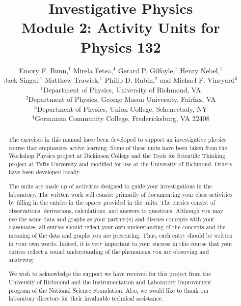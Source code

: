 \title{Investigative Physics\\
Module 2: Activity Units for Physics 132}

\author{Emory F. Bunn,$^1$ Mirela Fetea,$^4$ Gerard P. Gilfoyle,$^1$ Henry Nebel,$^1$ \\Jack Singal,$^1$ Matthew Trawick,$^1$ Philip D. Rubin,$^2$ and Michael F. Vineyard$^3$\\[4pt]
$^1$Department of Physics, University of Richmond, VA \\[4pt]
$^2$Department of Physics, George Mason University, Fairfax, VA \\[4pt]
$^3$Department of Physics, Union College, Schenectady, NY \\[4pt]
$^4$Germanna Community College, Fredericksburg, VA 22408}


\maketitle
\begin{abstract}
The exercises in this manual have been developed to support an investigative
physics course that emphasizes active learning. Some of these units
have been taken from the Workshop Physics project at Dickinson College
and the Tools for Scientific Thinking project at Tufts University
and modified for use at the University of Richmond. Others have been
developed locally. 

The units are made up of activities designed to guide your investigations
in the laboratory. The written work will consist primarily of documenting
your class activities by filling in the entries in the spaces provided
in the units. The entries consist of observations, derivations, calculations,
and answers to questions. Although you may use the same data and graphs
as your partner(s) and discuss concepts with your classmates, all
entries should reflect your own understanding of the concepts and
the meaning of the data and graphs you are presenting. Thus, each
entry should be written in your own words. Indeed, it is very important
to your success in this course that your entries reflect a sound understanding
of the phenomena you are observing and analyzing. 

We wish to acknowledge the support we have received for this project
from the University of Richmond and the Instrumentation and Laboratory
Improvement program of the National Science Foundation. Also, we would
like to thank our laboratory directors for their invaluable technical
assistance.
\end{abstract}

